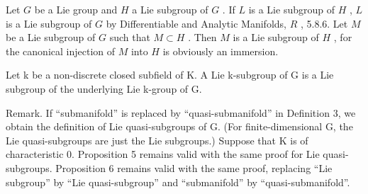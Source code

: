 Let \(G\) be a Lie group and \(H\) a Lie subgroup of \(G\) . If \(L\) is a Lie subgroup of \(H\) , \(L\) is a Lie subgroup of \(G\) by Differentiable and Analytic Manifolds, \(R\) , 5.8.6. Let \(M\) be a Lie subgroup of \(G\) such that \(M \subset H\) . Then \(M\) is a Lie subgroup of \(H\) , for the canonical injection of \(M\) into \(H\) is obviously an immersion.

Let k be a non-discrete closed subfield of K. A Lie k-subgroup of G is a Lie subgroup of the underlying Lie k-group of G.

Remark. If ``submanifold'' is replaced by ``quasi-submanifold'' in Definition 3, we obtain the definition of Lie quasi-subgroups of G. (For finite-dimensional G, the Lie quasi-subgroups are just the Lie subgroups.) Suppose that K is of characteristic 0. Proposition 5 remains valid with the same proof for Lie quasi-subgroups. Proposition 6 remains valid with the same proof, replacing ``Lie subgroup'' by ``Lie quasi-subgroup'' and ``submanifold'' by ``quasi-submanifold''.

